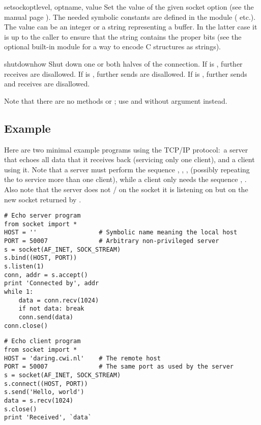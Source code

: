\begin{methoddesc}[socket]{setsockopt}{level, optname, value}
Set the value of the given socket option (see the \UNIX{} manual page
).  The needed symbolic constants are defined in
the  module ( etc.).  The value can be an
integer or a string representing a buffer.  In the latter case it is
up to the caller to ensure that the string contains the proper bits
(see the optional built-in module
 for a way to encode C
structures as strings). 
\end{methoddesc}

\begin{methoddesc}[socket]{shutdown}{how}
Shut down one or both halves of the connection.  If  is
, further receives are disallowed.  If  is ,
further sends are disallowed.  If  is , further sends
and receives are disallowed.
\end{methoddesc}

Note that there are no methods  or ;
use  and  without  argument
instead.


\subsection{Example \label{socket-example}}

Here are two minimal example programs using the TCP/IP protocol:\ a
server that echoes all data that it receives back (servicing only one
client), and a client using it.  Note that a server must perform the
sequence , , ,
 (possibly repeating the  to service
more than one client), while a client only needs the sequence
, .  Also note that the server
does not / on the 
socket it is listening on but on the new socket returned by
.

\begin{verbatim}
# Echo server program
from socket import *
HOST = ''                 # Symbolic name meaning the local host
PORT = 50007              # Arbitrary non-privileged server
s = socket(AF_INET, SOCK_STREAM)
s.bind((HOST, PORT))
s.listen(1)
conn, addr = s.accept()
print 'Connected by', addr
while 1:
    data = conn.recv(1024)
    if not data: break
    conn.send(data)
conn.close()
\end{verbatim}

\begin{verbatim}
# Echo client program
from socket import *
HOST = 'daring.cwi.nl'    # The remote host
PORT = 50007              # The same port as used by the server
s = socket(AF_INET, SOCK_STREAM)
s.connect((HOST, PORT))
s.send('Hello, world')
data = s.recv(1024)
s.close()
print 'Received', `data`
\end{verbatim}
